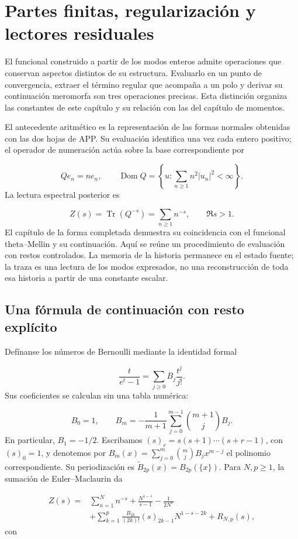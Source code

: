 \section{Partes finitas, regularización y lectores residuales}
\label{lectura:manuscrito-04}
El funcional construido a partir de los modos enteros admite operaciones que conservan aspectos distintos de su estructura. Evaluarlo en un punto de convergencia, extraer el término regular que acompaña a un polo y derivar su continuación meromorfa son tres operaciones precisas. Esta distinción organiza las constantes de este capítulo y su relación con las del capítulo de momentos.

El antecedente aritmético es la representación de las formas normales obtenidas con las dos hojas de APP. Su evaluación identifica una vez cada entero positivo; el operador de numeración actúa sobre la base correspondiente por

\[
Qe_n=ne_n,\qquad
\operatorname{Dom}Q=\left\{u:\sum_{n\geq1}n^2|u_n|^2<\infty\right\}.
\]
La lectura espectral posterior es

\[
Z(s)=\operatorname{Tr}(Q^{-s})=\sum_{n\geq1}n^{-s},\qquad \Re s>1.
\]
El capítulo de la forma completada demuestra su coincidencia con el funcional theta–Mellin y su continuación. Aquí se reúne un procedimiento de evaluación con restos controlados. La memoria de la historia permanece en el estado fuente; la traza es una lectura de los modos expresados, no una reconstrucción de toda esa historia a partir de una constante escalar.

\subsection{Una fórmula de continuación con resto explícito}
Defínanse los números de Bernoulli mediante la identidad formal

\[
\frac{t}{e^t-1}=\sum_{j\geq0}B_j\frac{t^j}{j!}.
\]
Sus coeficientes se calculan sin una tabla numérica:

\[
B_0=1,\qquad
B_m=-\frac1{m+1}\sum_{j=0}^{m-1}\binom{m+1}{j}B_j.
\]
En particular, \(B_1=-1/2\). Escribamos \((s)_r=s(s+1)\cdots(s+r-1)\), con \((s)_0=1\), y denotemos por \(B_m(x)=\sum_{j=0}^m\binom mjB_jx^{m-j}\) el polinomio correspondiente. Su periodización es \(\widetilde B_{2p}(x)=B_{2p}(\{x\})\). Para \(N,p\geq1\), la sumación de Euler–Maclaurin da

\[
\begin{aligned}
Z(s)={}&\sum_{n=1}^N n^{-s}+\frac{N^{1-s}}{s-1}-\frac1{2N^s}\\
&+\sum_{k=1}^p\frac{B_{2k}}{(2k)!}(s)_{2k-1}N^{1-s-2k}
+R_{N,p}(s),
\end{aligned}
\]
con

